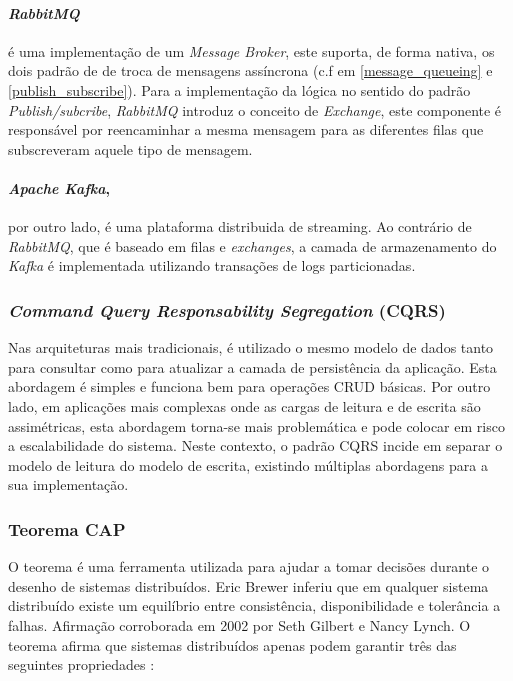 \paragraph{\emph{RabbitMQ}} é uma implementação de um \emph{Message Broker}, este suporta, de forma nativa, os dois padrão de de troca de mensagens assíncrona (c.f em \ref{message_queueing} e \ref{publish_subscribe}). Para a implementação da lógica no sentido do padrão \emph{Publish/subcribe}, \emph{RabbitMQ} introduz o conceito de \emph{Exchange}, este componente é responsável por reencaminhar a mesma mensagem para as diferentes filas que subscreveram aquele tipo de mensagem.

\paragraph{\emph{Apache Kafka},} por outro lado, é uma plataforma distribuida de streaming. Ao contrário de \emph{RabbitMQ}, que é baseado em filas e \emph{exchanges}, a camada de armazenamento do \emph{Kafka} é implementada utilizando transações de logs particionadas.

\subsubsection{\emph{Command Query Responsability Segregation} (CQRS)} \label{cqrs}
Nas arquiteturas mais tradicionais, é utilizado o mesmo modelo de dados tanto para consultar como para atualizar a camada de persistência da aplicação. Esta abordagem é simples e funciona bem para operações CRUD básicas. Por outro lado, em aplicações mais complexas onde as cargas de leitura e de escrita são assimétricas, esta abordagem torna-se mais problemática e pode colocar em risco a escalabilidade do sistema. Neste contexto, o padrão CQRS incide em separar o modelo de leitura do modelo de escrita, existindo múltiplas abordagens para a sua implementação. \cite{cqrs}

\subsubsection{Teorema CAP} \label{cap_theorem}

O teorema é uma ferramenta utilizada para ajudar a tomar decisões durante o desenho de sistemas distribuídos. Eric Brewer inferiu que em qualquer sistema distribuído existe um equilíbrio entre consistência, disponibilidade e tolerância a falhas. Afirmação corroborada em 2002 por Seth Gilbert e Nancy Lynch. O teorema afirma que sistemas distribuídos apenas podem garantir três das seguintes propriedades \cite{cap_theorem}:

